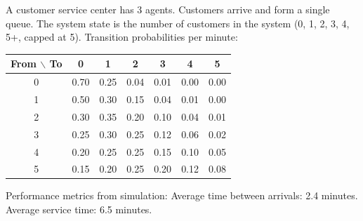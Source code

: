 \documentclass[12pt]{article}
\begin{document}
A customer service center has 3 agents. Customers arrive and form a single queue. The system state is the number of customers in the system (0, 1, 2, 3, 4, 5+, capped at 5). Transition probabilities per minute:

\begin{center}
\begin{tabular}{ccccccc}
\toprule
From $\backslash$ To & 0 & 1 & 2 & 3 & 4 & 5 \\
\midrule
0 & 0.70 & 0.25 & 0.04 & 0.01 & 0.00 & 0.00 \\
1 & 0.50 & 0.30 & 0.15 & 0.04 & 0.01 & 0.00 \\
2 & 0.30 & 0.35 & 0.20 & 0.10 & 0.04 & 0.01 \\
3 & 0.25 & 0.30 & 0.25 & 0.12 & 0.06 & 0.02 \\
4 & 0.20 & 0.25 & 0.25 & 0.15 & 0.10 & 0.05 \\
5 & 0.15 & 0.20 & 0.25 & 0.20 & 0.12 & 0.08 \\
\bottomrule
\end{tabular}
\end{center}

Performance metrics from simulation: Average time between arrivals: 2.4 minutes. Average service time: 6.5 minutes.
\end{document}
